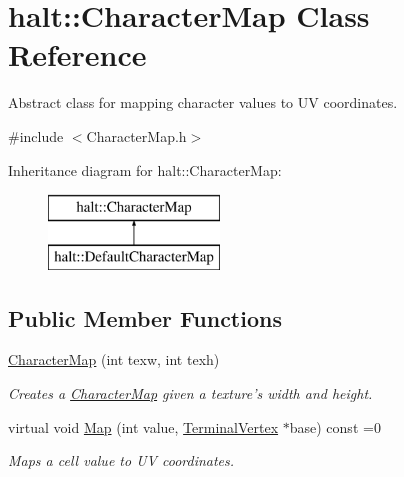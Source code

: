\hypertarget{classhalt_1_1_character_map}{\section{halt\-:\-:\-Character\-Map \-Class \-Reference}
\label{classhalt_1_1_character_map}
}


\-Abstract class for mapping character values to \-U\-V coordinates.  




{\ttfamily \#include $<$\-Character\-Map.\-h$>$}

\-Inheritance diagram for halt\-:\-:\-Character\-Map\-:\begin{figure}[H]
\begin{center}
\leavevmode
\includegraphics[height=2.000000cm]{classhalt_1_1_character_map}
\end{center}
\end{figure}
\subsection*{\-Public \-Member \-Functions}
\begin{DoxyCompactItemize}
\item 
\hyperlink{classhalt_1_1_character_map_a7a648f9006981378e8cd4ba1cd4c450c}{\-Character\-Map} (int texw, int texh)
\begin{DoxyCompactList}\small\item\em \-Creates a \hyperlink{classhalt_1_1_character_map}{\-Character\-Map} given a texture's width and height. \end{DoxyCompactList}\item 
virtual void \hyperlink{classhalt_1_1_character_map_a54526db15aa6210cca956de86636f26b}{\-Map} (int value, \hyperlink{structhalt_1_1_terminal_vertex}{\-Terminal\-Vertex} $\ast$base) const =0
\begin{DoxyCompactList}\small\item\em \-Maps a cell value to \-U\-V coordinates. \end{DoxyCompactList}\end{DoxyCompactItemize}
